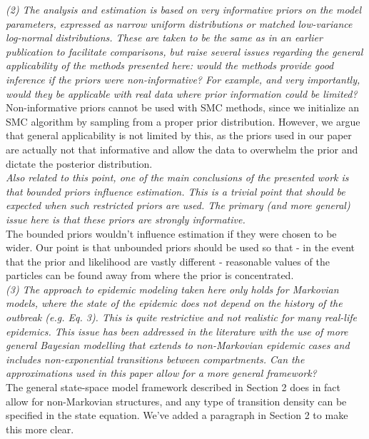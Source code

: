 \documentclass{article}
\begin{document}
\noindent \emph{(2) The analysis and estimation is based on very informative priors on the model parameters, expressed as narrow uniform distributions or matched low-variance log-normal distributions. These are taken to be the same as in an earlier publication to facilitate comparisons, but raise several issues regarding the general applicability of the methods presented here: would the methods provide good inference if the priors were non-informative? For example, and very importantly, would they be applicable with real data where prior information could be limited?} \\

Non-informative priors cannot be used with SMC methods, since we initialize an SMC algorithm by sampling from a proper prior distribution. However, we argue that general applicability is not limited by this, as the priors used in our paper are actually not that informative and allow the data to overwhelm the prior and dictate the posterior distribution. \\

\noindent \emph{Also related to this point, one of the main conclusions of the presented work is that bounded priors influence estimation. This is a trivial point that should be expected when such restricted priors are used. The primary (and more general) issue here is that these priors are strongly informative.} \\

The bounded priors wouldn't influence estimation if they were chosen to be wider. Our point is that unbounded priors should be used so that - in the event that the prior and likelihood are vastly different - reasonable values of the particles can be found away from where the prior is concentrated. \\

\noindent \emph{(3) The approach to epidemic modeling taken here only holds for Markovian models, where the state of the epidemic does not depend on the history of the outbreak (e.g. Eq. 3). This is quite restrictive and not realistic for many real-life epidemics. This issue has been addressed in the literature with the use of more general Bayesian modelling that extends to non-Markovian epidemic cases and includes non-exponential transitions between compartments. Can the approximations used in this paper allow for a more general framework?} \\

The general state-space model framework described in Section 2 does in fact allow for non-Markovian structures, and any type of transition density can be specified in the state equation. We've added a paragraph in Section 2 to make this more clear. \\
\end{document}
